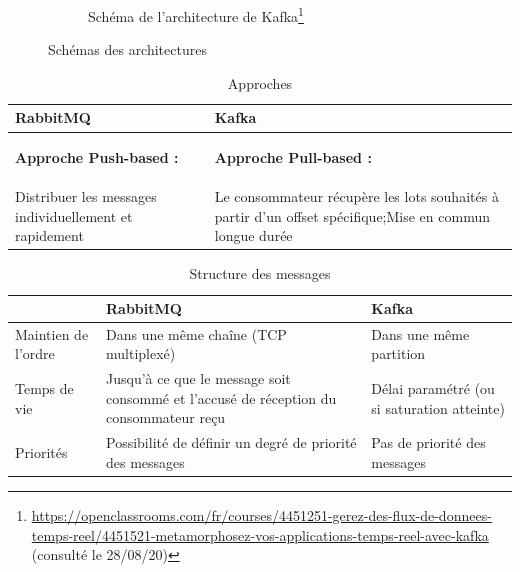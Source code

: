 \documentclass[11pt]{article}
\begin{document}
\begin{figure}
\begin{subfigure}{0.5\textwidth}
					\caption{Schéma de l'architecture de Kafka\footnote{\href{https://openclassrooms.com/fr/courses/4451251-gerez-des-flux-de-donnees-temps-reel/4451521-metamorphosez-vos-applications-temps-reel-avec-kafka}{https://openclassrooms.com/fr/courses/4451251-gerez-des-flux-de-donnees-temps-reel/4451521-metamorphosez-vos-applications-temps-reel-avec-kafka} (consulté le 28/08/20)}}
					\label{fig:archikafka}
				\end{subfigure}
				\caption{Schémas des architectures}
				\label{fig:comparatifarchi}
			\end{figure}
			\medskip
			\begin{table}
				\begin{tabular}{|p{7.5cm}|p{7.5cm}|}
				\hline
				\rowcolor{lightgray} RabbitMQ & Kafka\\\hline
				\begin{center} \textbf{Approche Push-based :}\end{center} & \begin{center} \textbf{Approche Pull-based :}\end{center}\\\hline
				Distribuer les messages individuellement et rapidement & Le consommateur récupère les lots souhaités à partir d’un offset spécifique;\newline Mise en commun longue durée\\\hline
				\end{tabular}
				\caption{Approches}
				\label{tab:comparatifapp}
			\end{table}
			\medskip
			\begin{table}
				\begin{tabular}{|p{3cm}|p{6cm}|p{6cm}|}
					\hline
					\rowcolor{lightgray} & RabbitMQ & Kafka\\\hline
					Maintien de l'ordre & Dans une même chaîne (TCP multiplexé) & Dans une même partition\\\hline
					Temps de vie & Jusqu’à ce que le message soit consommé et l'accusé de réception du consommateur reçu & Délai paramétré (ou si saturation atteinte)\\\hline
					Priorités & Possibilité de définir un degré de priorité des messages & Pas de priorité des messages \\\hline
				\end{tabular}
				\caption{Structure des messages}
				\label{tab:comparatifmess}
			\end{table}
			\medskip
\end{document}
